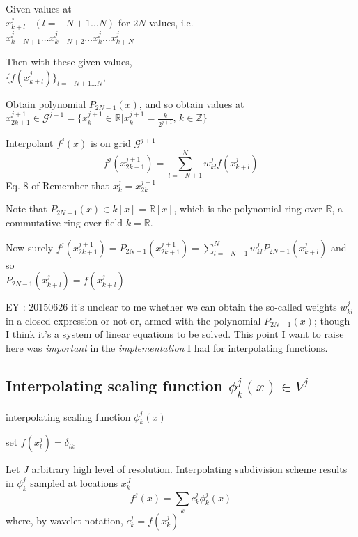 \documentclass[twoside]{amsart}
\theoremstyle{plain}
\theoremstyle{definition}
\theoremstyle{remark}
\numberwithin{equation}{section}
\begin{document}
Given values at \\
\phantom{ \quad \quad \, } $x^j_{k+l}$ \, $(l = -N+1 \dots N)$ for $2N$ values, i.e. \\
\phantom{ \quad \quad \, } $x^j_{k-N+1} \dots x^j_{k-N+2} \dots x^j_k \dots x^j_{k+N}$

Then with these given values, \\
\phantom{ \quad \, } $\lbrace f(x^j_{k+l}) \rbrace_{l = -N + 1 \dots N }$,


Obtain polynomial $P_{2N-1}(x)$, and so obtain values at \\
\phantom{\quad \quad \, } $x^{j+1}_{2k+1} \in \mathcal{G}^{j+1}  = \lbrace x^{j+1}_k \in \mathbb{R} | x_k^{j+1} = \frac{k}{2^{j+1}} , \, k \in \mathbb{Z} \rbrace$

Interpolant $f^j(x)$ is on grid $\mathcal{G}^{j+1}$
\begin{equation}
  f^j(x^{j+1}_{2k+1}) = \sum_{l=-N+1}^N w^j_{kl} f(x^j_{k+l})
\end{equation} Eq. 8 of \cite{OVasilyevCBowman2000}
Remember that $x^j_k = x^{j+1}_{2k}$

Note that $P_{2N-1}(x) \in k[x] = \mathbb{R}[x]$, which is the polynomial ring over $\mathbb{R}$, a commutative ring over field $k=\mathbb{R}$.  

Now surely $f^j(x^{j+1}_{2k+1}) = P_{2N-1}(x^{j+1}_{2k+1}) = \sum_{l=-N+1}^N w^j_{kl} P_{2N-1}(x^j_{k+l})$ and so \\
\phantom{Now surely }$P_{2N-1}(x^j_{k+l}) = f(x^j_{k+l})$

EY : 20150626 it's unclear to me whether we can obtain the so-called weights $w_{kl}^j$ in a closed expression or not or, armed with the polynomial $P_{2N-1}(x)$; though I think it's a system of linear equations to be solved.  This point I want to raise here was \emph{important} in the \emph{implementation} I had for interpolating functions.  

\subsection{Interpolating scaling function $\phi_k^j(x) \in V^j$}\label{SubSec:Interpolatingscalingfunction}

interpolating scaling function $\phi^j_k(x)$ 

set $f(x_l^j) = \delta_{lk}$

Let $J$ arbitrary high level of resolution.  Interpolating subdivision scheme results in $\phi_k^j$ sampled at locations $x_k^J$
\[
f^j(x) = \sum_k c_k^j \phi_k^j(x)
\]
where, by wavelet notation, $c_k^j = f(x_k^j)$
\end{document}
